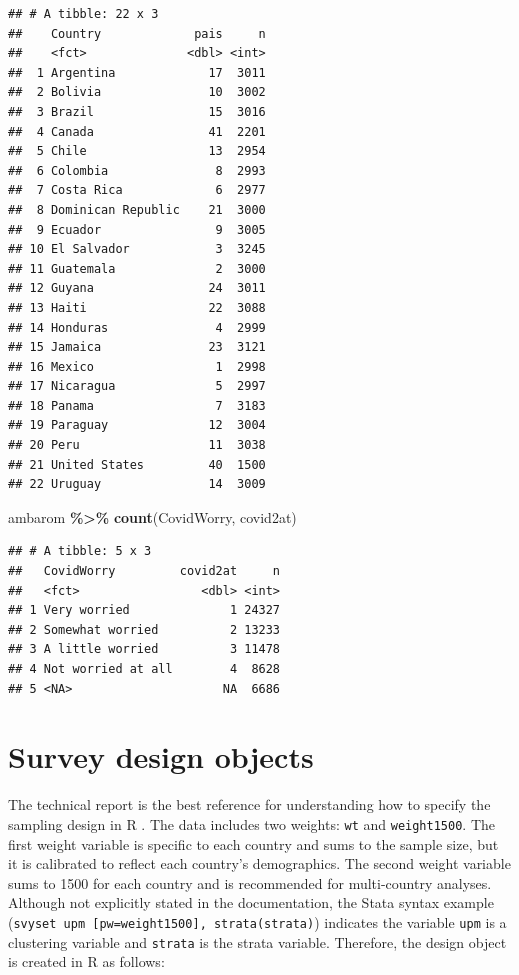 \documentclass[
]{krantz}
\makeatletter
\newenvironment{Shaded}{\begin{snugshade}}{\end{snugshade}}
\newcommand{\FunctionTok}[1]{\textcolor[rgb]{0.27,0.27,0.27}{\textbf{#1}}}
\newcommand{\NormalTok}[1]{#1}
\newcommand{\SpecialCharTok}[1]{\textcolor[rgb]{0.43,0.43,0.43}{\textbf{#1}}}
\newenvironment{kframe}{%
\medskip{}
\setlength{\fboxsep}{.8em}
 \def\at@end@of@kframe{}%
 \ifinner\ifhmode%
  \def\at@end@of@kframe{\end{minipage}}%
  \begin{minipage}{\columnwidth}%
 \fi\fi%
 \def\FrameCommand##1{\hskip\@totalleftmargin \hskip-\fboxsep
 \colorbox{shadecolor}{##1}\hskip-\fboxsep
     \hskip-\linewidth \hskip-\@totalleftmargin \hskip\columnwidth}%
 \MakeFramed {\advance\hsize-\width
   \@totalleftmargin\z@ \linewidth\hsize
   \@setminipage}}%
 {\par\unskip\endMakeFramed%
 \at@end@of@kframe}
\renewenvironment{Shaded}{\begin{kframe}}{\end{kframe}}
\makeatother
\begin{document}
\begin{verbatim}
## # A tibble: 22 x 3
##    Country             pais     n
##    <fct>              <dbl> <int>
##  1 Argentina             17  3011
##  2 Bolivia               10  3002
##  3 Brazil                15  3016
##  4 Canada                41  2201
##  5 Chile                 13  2954
##  6 Colombia               8  2993
##  7 Costa Rica             6  2977
##  8 Dominican Republic    21  3000
##  9 Ecuador                9  3005
## 10 El Salvador            3  3245
## 11 Guatemala              2  3000
## 12 Guyana                24  3011
## 13 Haiti                 22  3088
## 14 Honduras               4  2999
## 15 Jamaica               23  3121
## 16 Mexico                 1  2998
## 17 Nicaragua              5  2997
## 18 Panama                 7  3183
## 19 Paraguay              12  3004
## 20 Peru                  11  3038
## 21 United States         40  1500
## 22 Uruguay               14  3009
\end{verbatim}

\begin{Shaded}
\begin{Highlighting}[]
\NormalTok{ambarom }\SpecialCharTok{\%\textgreater{}\%}
  \FunctionTok{count}\NormalTok{(CovidWorry, covid2at)}
\end{Highlighting}
\end{Shaded}

\begin{verbatim}
## # A tibble: 5 x 3
##   CovidWorry         covid2at     n
##   <fct>                 <dbl> <int>
## 1 Very worried              1 24327
## 2 Somewhat worried          2 13233
## 3 A little worried          3 11478
## 4 Not worried at all        4  8628
## 5 <NA>                     NA  6686
\end{verbatim}

\hypertarget{survey-design-objects-1}{%
\section{Survey design objects}\label{survey-design-objects-1}}

The technical report is the best reference for understanding how to specify the sampling design in R \citep{lapop-tech}. The data includes two weights: \texttt{wt} and \texttt{weight1500}. The first weight variable is specific to each country and sums to the sample size, but it is calibrated to reflect each country's demographics. The second weight variable sums to 1500 for each country and is recommended for multi-country analyses. Although not explicitly stated in the documentation, the Stata syntax example (\texttt{svyset\ upm\ {[}pw=weight1500{]},\ strata(strata)}) indicates the variable \texttt{upm} is a clustering variable and \texttt{strata} is the strata variable. Therefore, the design object is created in R as follows:
\end{document}
